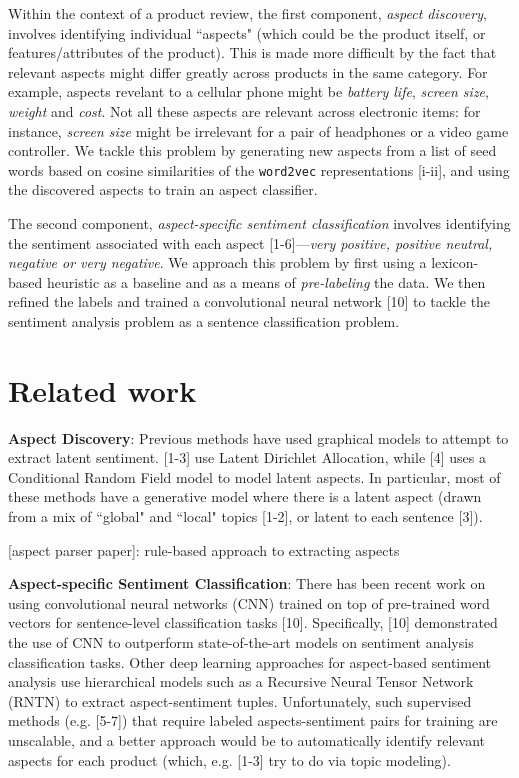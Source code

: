 \documentclass{article} %
\begin{document}
Within the context of a product review, the first component, \textit{aspect discovery}, involves identifying individual ``aspects" (which could be the product itself, or features/attributes of the product). This is made more difficult by the fact that relevant aspects might differ greatly across products in the same category. For example, aspects revelant to a cellular phone might be \textit{battery life}, \textit{screen size}, \textit{weight} and \textit{cost}. Not all these aspects are relevant across electronic items: for instance, \textit{screen size} might be irrelevant for a pair of headphones or a video game controller. We tackle this problem by generating new aspects from a list of seed words based on cosine similarities of the \texttt{word2vec} representations [i-ii], and using the discovered aspects to train an aspect classifier.

The second component, \textit{aspect-specific sentiment classification} involves identifying the sentiment associated with each aspect [1-6]---\textit{very positive, positive neutral, negative or very negative}. We approach this problem by first using a lexicon-based heuristic as a baseline and as a means of \textit{pre-labeling} the data. We then refined the labels and trained a convolutional neural network [10] to tackle the sentiment analysis problem as a sentence classification problem.

\section{Related work}


\textbf{Aspect Discovery}: Previous methods have used graphical models to attempt to extract latent sentiment. [1-3] use Latent Dirichlet Allocation, while [4] uses a Conditional Random Field model to model latent aspects. In particular, most of these methods have a generative model where there is a latent aspect (drawn from a mix of ``global" and ``local" topics [1-2], or latent to each sentence [3]). 


[aspect parser paper]: rule-based approach to extracting aspects

\textbf{Aspect-specific Sentiment Classification}: There has been recent work on using convolutional neural networks (CNN) trained on top of pre-trained word vectors for sentence-level classification tasks [10]. Specifically, [10] demonstrated the use of CNN to outperform state-of-the-art models on sentiment analysis classification tasks. Other deep learning approaches for aspect-based sentiment analysis use hierarchical models such as a Recursive Neural Tensor Network (RNTN) to extract aspect-sentiment tuples. Unfortunately, such supervised methods (e.g. [5-7]) that require labeled aspects-sentiment pairs for training are unscalable, and a better approach would be to automatically identify relevant aspects for each product (which, e.g. [1-3] try to do via topic modeling). 
\end{document}
